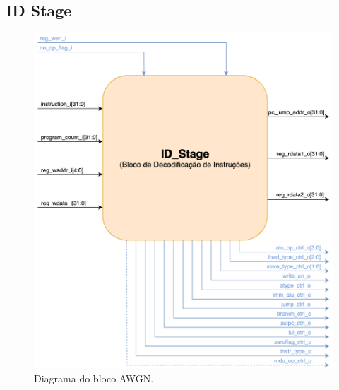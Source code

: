 \subsection{ID Stage}
\clearpage
\begin{figure}[!htb]
  \caption{Diagrama do bloco AWGN.}
  \vspace{0.2cm}
  \includegraphics[width=\linewidth]{images/ID_Stage(BLOCK).png}
\end{figure}

